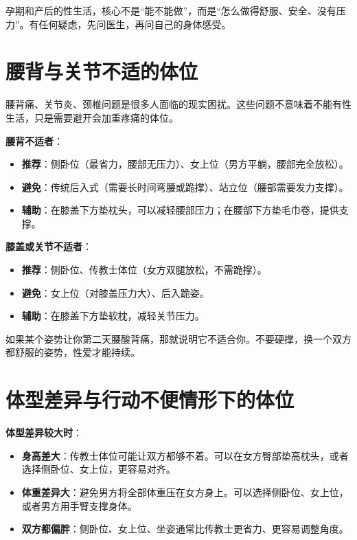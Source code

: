 \documentclass[12pt,UTF8]{ctexbook}
\begin{document}
\begin{tcolorbox}[colback=pink!5!white,colframe=red!50!black,title=贴心小叮咛]
孕期和产后的性生活，核心不是“能不能做”，而是“怎么做得舒服、安全、没有压力”。有任何疑虑，先问医生，再问自己的身体感受。
\end{tcolorbox}

\section{腰背与关节不适的体位}

腰背痛、关节炎、颈椎问题是很多人面临的现实困扰。这些问题不意味着不能有性生活，只是需要避开会加重疼痛的体位。

\textbf{腰背不适者}：

\begin{itemize}
\item \textbf{推荐}：侧卧位（最省力，腰部无压力）、女上位（男方平躺，腰部完全放松）。
\item \textbf{避免}：传统后入式（需要长时间弯腰或跪撑）、站立位（腰部需要发力支撑）。
\item \textbf{辅助}：在膝盖下方垫枕头，可以减轻腰部压力；在腰部下方垫毛巾卷，提供支撑。
\end{itemize}

\textbf{膝盖或关节不适者}：

\begin{itemize}
\item \textbf{推荐}：侧卧位、传教士体位（女方双腿放松，不需跪撑）。
\item \textbf{避免}：女上位（对膝盖压力大）、后入跪姿。
\item \textbf{辅助}：在膝盖下方垫软枕，减轻关节压力。
\end{itemize}

\begin{tcolorbox}[colback=pink!5!white,colframe=red!50!black,title=贴心小叮咛]
如果某个姿势让你第二天腰酸背痛，那就说明它不适合你。不要硬撑，换一个双方都舒服的姿势，性爱才能持续。
\end{tcolorbox}

\section{体型差异与行动不便情形下的体位}

\textbf{体型差异较大时}：

\begin{itemize}
\item \textbf{身高差大}：传教士体位可能让双方都够不着。可以在女方臀部垫高枕头，或者选择侧卧位、女上位，更容易对齐。
\item \textbf{体重差异大}：避免男方将全部体重压在女方身上。可以选择侧卧位、女上位，或者男方用手臂支撑身体。
\item \textbf{双方都偏胖}：侧卧位、女上位、坐姿通常比传教士更省力、更容易调整角度。
\end{itemize}
\end{document}
